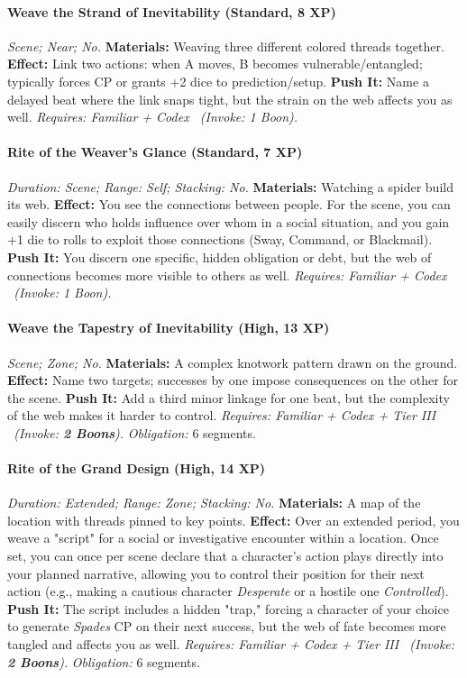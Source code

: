 \paragraph{Weave the Strand of Inevitability (Standard, 8 XP)} \emph{Scene; Near; No.}
\textbf{Materials:} Weaving three different colored threads together.
\textbf{Effect:} Link two actions: when A moves, B becomes vulnerable/entangled; typically forces CP or grants +2 dice to prediction/setup.
\textbf{Push It:} Name a delayed beat where the link snaps tight, but the strain on the web affects you as well.
\emph{Requires: Familiar + Codex \ (\textit{Invoke:} 1 Boon).}
\paragraph{Rite of the Weaver's Glance (Standard, 7 XP)} \emph{Duration: Scene; Range: Self; Stacking: No.}
\textbf{Materials:} Watching a spider build its web.
\textbf{Effect:} You see the connections between people. For the scene, you can easily discern who holds influence over whom in a social situation, and you gain +1 die to rolls to exploit those connections (Sway, Command, or Blackmail).
\textbf{Push It:} You discern one specific, hidden obligation or debt, but the web of connections becomes more visible to others as well.
\emph{Requires: Familiar + Codex \ (\textit{Invoke:} 1 Boon).}
\paragraph{Weave the Tapestry of Inevitability (High, 13 XP)} \emph{Scene; Zone; No.}
\textbf{Materials:} A complex knotwork pattern drawn on the ground.
\textbf{Effect:} Name two targets; successes by one impose consequences on the other for the scene.
\textbf{Push It:} Add a third minor linkage for one beat, but the complexity of the web makes it harder to control.
\emph{Requires: Familiar + Codex + Tier III \ (\textit{Invoke:} \textbf{2 Boons}).}
\emph{Obligation:} 6 segments.

\paragraph{Rite of the Grand Design (High, 14 XP)} \emph{Duration: Extended; Range: Zone; Stacking: No.}
\textbf{Materials:} A map of the location with threads pinned to key points.
\textbf{Effect:} Over an extended period, you weave a "script" for a social or investigative encounter within a location. Once set, you can once per scene declare that a character's action plays directly into your planned narrative, allowing you to control their position for their next action (e.g., making a cautious character \emph{Desperate} or a hostile one \emph{Controlled}).
\textbf{Push It:} The script includes a hidden "trap," forcing a character of your choice to generate \emph{Spades} CP on their next success, but the web of fate becomes more tangled and affects you as well.
\emph{Requires: Familiar + Codex + Tier III \ (\textit{Invoke:} \textbf{2 Boons}).}
\emph{Obligation:} 6 segments.

